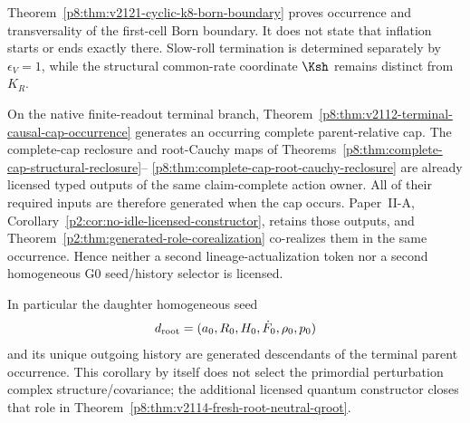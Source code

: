 \documentclass[12pt,a4paper]{article}
\begin{document}
\begin{remark}
\label{p8:rem:v2121-k8-boundary-not-end}
Theorem~\ref{p8:thm:v2121-cyclic-k8-born-boundary} proves occurrence and
transversality of the first-cell Born boundary.  It does not state that
inflation starts or ends exactly there.  Slow-roll termination is determined
separately by \(\epsilon_V=1\), while the structural common-rate coordinate
\(\Ksh\) remains distinct from \(K_R\).
\end{remark}

\begin{corollary}
\label{p8:cor:cyclic-lineage-homogeneous-g0-contraction}
\label{p8:cor:v2112-no-duplicate-lineage-occurrence}
On the native finite-readout terminal branch,
Theorem~\ref{p8:thm:v2112-terminal-causal-cap-occurrence} generates an occurring
complete parent-relative cap.  The complete-cap reclosure and root-Cauchy maps
of Theorems~\ref{p8:thm:complete-cap-structural-reclosure}--
\ref{p8:thm:complete-cap-root-cauchy-reclosure} are already licensed typed
outputs of the same claim-complete action owner.  All of their required inputs
are therefore generated when the cap occurs.  Paper~II-A,
Corollary~\ref{p2:cor:no-idle-licensed-constructor}, retains those outputs, and
Theorem~\ref{p2:thm:generated-role-corealization} co-realizes them in the same
occurrence.  Hence neither a second lineage-actualization token nor a second
homogeneous G0 seed/history selector is licensed.

In particular the daughter homogeneous seed
\[
 d_{\rm root}
 =(a_0,R_0,H_0,\dot F_0,\rho_0,p_0)
\]
and its unique outgoing history are generated descendants of the terminal
parent occurrence.  This corollary by itself does not select the primordial perturbation complex structure/covariance; the additional licensed quantum constructor closes that role in Theorem~\ref{p8:thm:v2114-fresh-root-neutral-qroot}.
\end{corollary}
\end{document}
